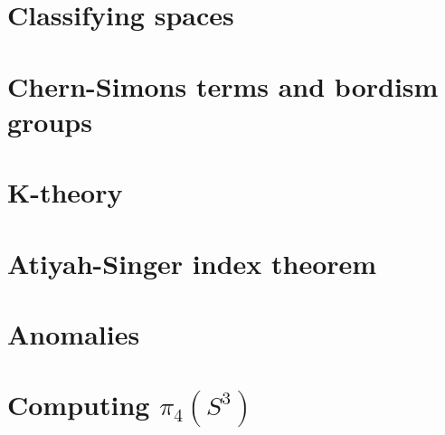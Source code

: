 \documentclass[12pt]{article}
\numberwithin{equation}{section}
\theoremstyle{remark}
\begin{document}
\section{Classifying spaces}

\section{Chern-Simons terms and bordism groups}

\section{K-theory}

\section{Atiyah-Singer index theorem}

\section{Anomalies}

\section{Computing \texorpdfstring{$\pi_4(S^3)$}{pi4(S3)}}



\end{document}
